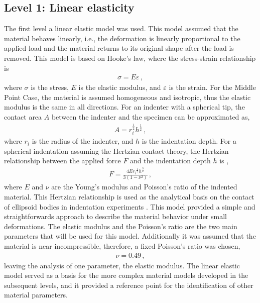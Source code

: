 \subsection{Level 1: Linear elasticity}
The first level a linear elastic model was used. This model assumed that the material behaves linearly, 
i.e., the deformation is linearly proportional to the applied load and the material returns to its original 
shape after the load is removed. This model is based on Hooke's law, where the stress-strain relationship is 
\begin{align}
    \sigma = E\varepsilon \, ,
\end{align}
where $\sigma$ is the stress, $E$ is the elastic modulus, and $\varepsilon$ is the strain. 
For the Middle Point Case, the material is assumed homogeneous and isotropic, thus the elastic modulus is the 
same in all directions. 
For an indenter with a spherical tip, the contact area $A$ between the indenter and the specimen can be approximated as, 
\begin{align}
    A = r_i^{\frac{1}{2}} h^{\frac{1}{2}} \, ,
\end{align}
where $r_i$ is the radius of the indenter, and $h$ is the indentation depth.
For a spherical indentation assuming the Hertzian contact theory, the Hertzian relationship 
between the applied force $F$ and the indentation depth $h$ is \cite{Lin2009}, 
\begin{align}
    F = \frac{4E{r_i}^{\frac{1}{2}} {h}^{\frac{3}{2}}}{3(1-\nu^2)} \, ,
\end{align}
where $E$ and $\nu$ are the Young's modulus and Poisson's ratio of the indented material.
This Hertzian relationship is used as the analytical basis on the contact of ellipsoid bodies in 
indentation experiments \cite{Lin2009}.
This model provided a simple and straightforwards approach to describe the material behavior under 
small deformations. The elastic modulus and the Poisson's ratio are the two main parameters 
that will be used for this model. Additionally it was assumed that the material is near incompressible,
therefore, a fixed Poisson's ratio was chosen, 
\begin{align}
    \nu = 0.49 \, ,
\end{align}
leaving the analysis of one parameter, the elastic modulus. The linear elastic model served as a basis for the more 
complex material models developed in the subsequent levels, and it provided a reference point for 
the identification of other material parameters.


